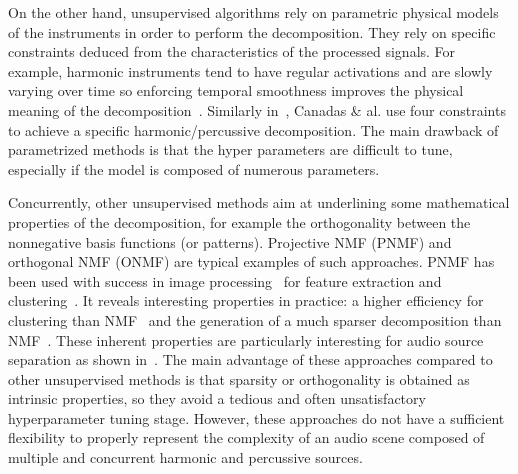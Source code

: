 On the other hand, unsupervised algorithms rely on parametric physical models of the instruments in order to perform the decomposition. They rely on specific constraints deduced from the characteristics of the processed signals. For example, harmonic instruments tend to have regular activations and are slowly varying over time so enforcing temporal smoothness improves the physical meaning of the decomposition~\cite{Virtanen}. Similarly in~\cite{canadas2014percussive}, Canadas \& al. use four constraints to achieve a specific harmonic/percussive decomposition. The main drawback of parametrized methods is that the hyper parameters are difficult to tune, especially if the model is composed of numerous parameters. 

Concurrently, other unsupervised methods aim at underlining some mathematical properties of the decomposition, for example the orthogonality between the nonnegative basis functions (or patterns). Projective NMF (PNMF) and orthogonal NMF (ONMF) are typical examples of such approaches. PNMF has been used with success in image processing~\cite{choi} for feature extraction and clustering~\cite{YangOja10}. It reveals interesting properties in practice: a higher efficiency for clustering than NMF~\cite{choi} and the generation of a much sparser decomposition than NMF~\cite{YangOja10}. These inherent properties are particularly interesting for audio source separation as shown in~\cite{canadas2014percussive,vincent2010adaptive}. 
The main advantage of these approaches compared to other unsupervised methods is that sparsity or orthogonality is obtained as intrinsic properties, so they avoid a tedious and often unsatisfactory hyperparameter tuning stage. However, these approaches do not have a sufficient flexibility to properly represent the complexity of an audio scene composed of multiple and concurrent harmonic and percussive sources.





